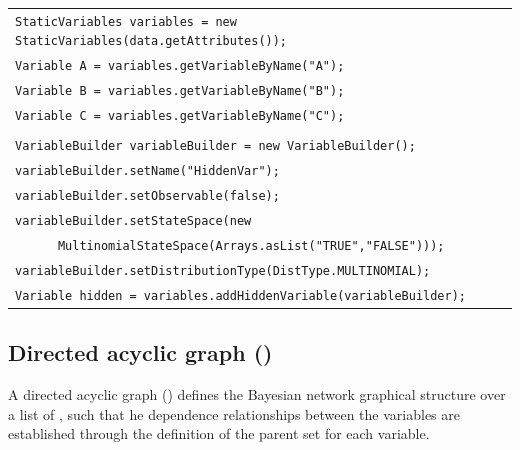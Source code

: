 \begin{table}[H]
\begin{tabular}{l} \\ \hline

        \texttt{StaticVariables variables = new StaticVariables(data.getAttributes());}\\

        \texttt{Variable A = variables.getVariableByName("A");}\\
        \texttt{Variable B = variables.getVariableByName("B");}\\
        \texttt{Variable C = variables.getVariableByName("C");}\\\\

        \texttt{VariableBuilder variableBuilder = new VariableBuilder();}\\
        \texttt{variableBuilder.setName("HiddenVar");}\\
        \texttt{variableBuilder.setObservable(false);}\\
        \texttt{variableBuilder.setStateSpace(new }\\  \texttt{~~~~~~MultinomialStateSpace(Arrays.asList("TRUE","FALSE")));}\\
        \texttt{variableBuilder.setDistributionType(DistType.MULTINOMIAL);}\\
        \texttt{Variable hidden = variables.addHiddenVariable(variableBuilder);}\\ \hline 

\end{tabular}
\end{table}


\subsection{Directed acyclic graph ()}

A directed acyclic graph () defines the Bayesian network graphical structure over a list of , such that he dependence relationships between the variables are established through the definition of the parent set for each variable. 


